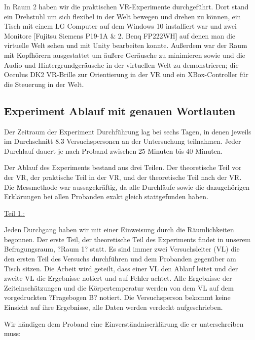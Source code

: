 \documentclass{Bericht}
\begin{document}
In Raum 2 haben wir die praktischen VR-Experimente durchgeführt. Dort stand ein Drehstuhl um sich flexibel in der Welt bewegen und drehen zu können, ein Tisch mit einem LG Computer auf dem  Windows 10 installiert war und zwei Monitore [Fujitsu Siemens P19-1A \& 2. Benq FP222WH] auf denen man die virtuelle Welt sehen und mit Unity bearbeiten konnte. Außerdem war der Raum mit Kopfhörern ausgestattet um äußere Geräusche zu minimieren sowie und die Audio und Hintergrundgeräusche in der virtuellen Welt zu demonstrieren; die Occulus DK2 VR-Brille zur Orientierung in der VR und ein XBox-Controller für die Steuerung in der Welt.


\subsection {Experiment Ablauf mit genauen Wortlauten}

Der Zeitraum der Experiment Durchführung lag bei sechs Tagen, in denen jeweils im Durchschnitt 8.3 Versuchspersonen an der Untersuchung teilnahmen. Jeder Durchlauf dauert je nach Proband zwischen 25 Minuten bis 40 Minuten.

\par

Der Ablauf des Experiments bestand aus drei Teilen. Der theoretische Teil vor der VR, der praktische Teil in der VR, und der theoretische Teil nach der VR. Die Messmethode war aussagekräftig, da alle Durchläufe sowie die dazugehörigen Erklärungen bei allen Probanden exakt gleich stattgefunden haben.

\par

\underline{Teil 1.:}

Jeden Durchgang haben wir mit einer Einweisung durch die Räumlichkeiten begonnen. Der erste Teil, der theoretische Teil des Experiments findet in unserem Befragungsraum, ?Raum 1? statt. Es sind immer zwei Versuchsleiter (VL) die den ersten Teil des Versuchs durchführen und dem Probanden gegenüber am Tisch sitzen. Die Arbeit wird geteilt, dass einer VL den Ablauf leitet und der zweite VL die Ergebnisse notiert und auf Fehler achtet. Alle Ergebnisse der Zeiteinschätzungen und die Körpertemperatur werden von dem VL auf dem vorgedruckten ?Fragebogen B? notiert. Die Versuchsperson bekommt keine Einsicht auf ihre Ergebnisse, alle Daten werden verdeckt aufgeschrieben.

\par

Wir händigen dem Proband eine Einverständniserklärung die er unterschreiben muss:
\end{document}
